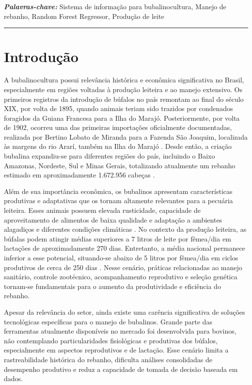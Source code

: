 \documentclass[11pt,a4paper]{article}
\begin{document}
\vspace{0.3cm}
\noindent\textit{\textbf{Palavras-chave:}} Sistema de informação para bubalinocultura, Manejo de rebanho, Random Forest Regressor, Produção de leite 

\vspace{0.5cm}
\noindent\rule{\textwidth}{0.5pt}
\vspace{0.5cm}

\section{Introdução}
A bubalinocultura possui relevância histórica e econômica significativa no Brasil, especialmente em regiões voltadas à produção leiteira e ao manejo extensivo. Os primeiros registros da introdução de búfalos no país remontam ao final do século XIX, por volta de 1895, quando animais teriam sido trazidos por condenados foragidos da Guiana Francesa para a Ilha do Marajó. Posteriormente, por volta de 1902, ocorreu uma das primeiras importações oficialmente documentadas, realizada por Bertino Lobato de Miranda para a Fazenda São Joaquim, localizada às margens do rio Ararí, também na Ilha do Marajó \cite{ABCB2016}. Desde então, a criação bubalina expandiu-se para diferentes regiões do país, incluindo o Baixo Amazonas, Nordeste, Sul e Minas Gerais, totalizando atualmente um rebanho estimado em aproximadamente 1.672.956 cabeças \cite{IBGE2023}.

Além de sua importância econômica, os bubalinos apresentam características produtivas e adaptativas que os tornam altamente relevantes para a pecuária leiteira. Esses animais possuem elevada rusticidade, capacidade de aproveitamento de alimentos de baixa qualidade e adaptação a ambientes alagadiços e diferentes condições climáticas \cite{EMBRAPA2019}. No contexto da produção leiteira, as búfalas podem atingir médias superiores a 7 litros de leite por fêmea/dia em lactações de aproximadamente 270 dias. Entretanto, a média nacional permanece inferior a esse potencial, situando-se abaixo de 5 litros por fêmea/dia em ciclos produtivos de cerca de 250 dias \cite{Embrapa1998}. Nesse cenário, práticas relacionadas ao manejo sanitário, controle zootécnico, acompanhamento reprodutivo e seleção genética tornam-se fundamentais para o aumento da produtividade e eficiência do rebanho.

Apesar da relevância do setor, ainda existe uma carência significativa de soluções tecnológicas específicas para o manejo de bubalinos. Grande parte das ferramentas atualmente disponíveis no mercado foi desenvolvida para bovinos, não contemplando particularidades fisiológicas e produtivas dos búfalos, especialmente em aspectos reprodutivos e de lactação. Esse cenário limita a rastreabilidade histórica do rebanho, dificulta análises consolidadas de desempenho produtivo e reduz a capacidade de tomada de decisão baseada em dados.
\end{document}

